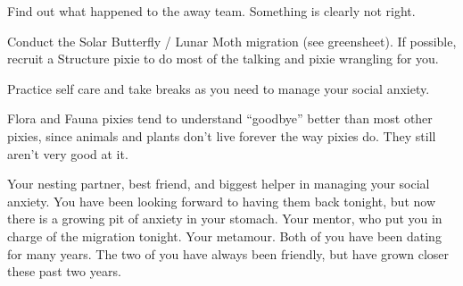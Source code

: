 \documentclass[char]{PP}
\begin{document}
\begin{itemz}
	\item Find out what happened to the away team. Something is clearly not right.
	\item Conduct the Solar Butterfly / Lunar Moth migration (see greensheet). If possible, recruit a Structure pixie to do most of the talking and pixie wrangling for you.
	\item Practice self care and take breaks as you need to manage your social anxiety.
\end{itemz}

\begin{itemz}[Notes]
	\item Flora and Fauna pixies tend to understand ``goodbye'' better than most other pixies, since animals and plants don’t live forever the way pixies do. They still aren't very good at it.
\end{itemz}

\begin{contacts}
	\contact{\cFLost{}} Your nesting partner, best friend, and biggest helper in managing your social anxiety. You have been looking forward to having them back tonight, but now there is a growing pit of anxiety in your stomach.
	\contact{\cFHead{}} Your mentor, who put you in charge of the migration tonight.
	\contact{\cMHead{}} Your metamour. Both of you have been dating \cFLost{} for many years. The two of you have always been friendly, but have grown closer these past two years.
\end{contacts}
\end{document}
